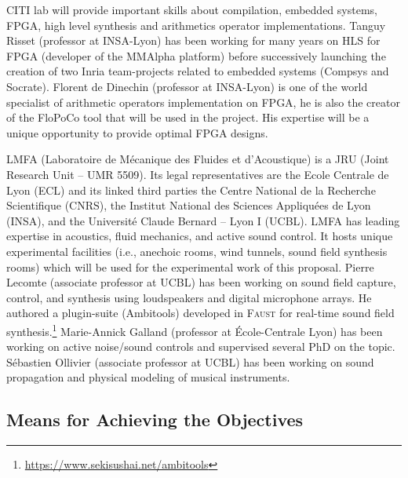 \documentclass[a4paper,9pt]{extarticle}
\newcommand{\F}{\textsc{Faust}}
\begin{document}
CITI lab will provide important skills about compilation, embedded systems, FPGA, high level synthesis and arithmetics operator implementations. Tanguy Risset (professor at INSA-Lyon) has been working for many years on HLS for FPGA (developer of the MMAlpha platform) before successively launching the creation of two Inria team-projects related to embedded systems (Compsys and Socrate). Florent de Dinechin (professor at INSA-Lyon) is one of the world specialist of arithmetic operators implementation on FPGA, he is also the creator of the FloPoCo tool that will be used in the project.  His expertise will be a unique opportunity to provide optimal FPGA designs.

LMFA (Laboratoire de Mécanique des Fluides et d'Acoustique) is a JRU (Joint Research Unit – UMR 5509). Its legal representatives are the Ecole Centrale de Lyon (ECL) and its linked third parties the Centre National de la Recherche Scientifique (CNRS), the Institut National des Sciences Appliquées de Lyon (INSA), and the Université Claude Bernard – Lyon I (UCBL). LMFA has leading expertise in acoustics, fluid mechanics, and active sound control. It hosts unique experimental facilities (i.e., anechoic rooms, wind tunnels, sound field synthesis rooms) which will be used for the experimental work of this proposal. Pierre Lecomte (associate professor at UCBL) has been working on sound field capture, control, and synthesis using loudspeakers and digital microphone arrays. He authored a plugin-suite (Ambitools) developed in \F{} for real-time sound field synthesis.\footnote{\url{https://www.sekisushai.net/ambitools}} Marie-Annick Galland (professor at École-Centrale Lyon) has been working on active noise/sound controls and supervised several PhD on the topic. Sébastien Ollivier (associate professor at UCBL) has been working on sound propagation and physical modeling of musical instruments.

\subsection{Means for Achieving the Objectives}
\end{document}
